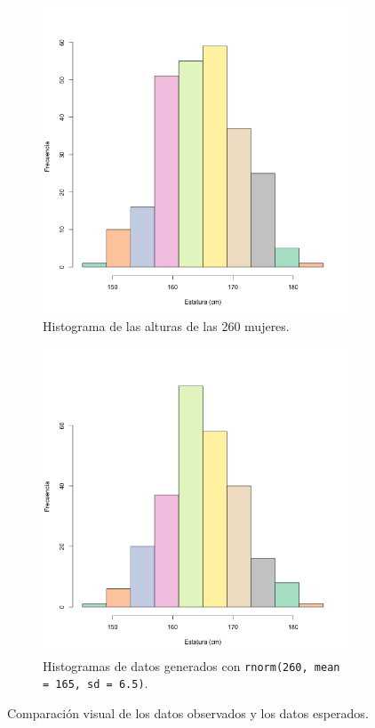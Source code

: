 \documentclass[12pt,letterpaper]{article}
\begin{document}
\begin{figure}
 	\centering 
 	\begin{subfigure}[b]{0.4\linewidth}
 		\includegraphics[width=\linewidth]{altura.png} 		
 		\caption{Histograma de las alturas de las 260 mujeres. }
 		 		\label{alt}
 	\end{subfigure}  \qquad
 	\begin{subfigure}[b]{0.4\linewidth}
 		\includegraphics[width=\linewidth]{altura1.png} 		
 		\caption{Histogramas de datos generados con \texttt{rnorm(260, mean = 165, sd = 6.5)}.}
 		\label{alt1}
 	\end{subfigure}
 	 	\caption{Comparación visual de los datos observados y los datos esperados.} 
 	 		\label{im}
\end{figure}
\end{document}
